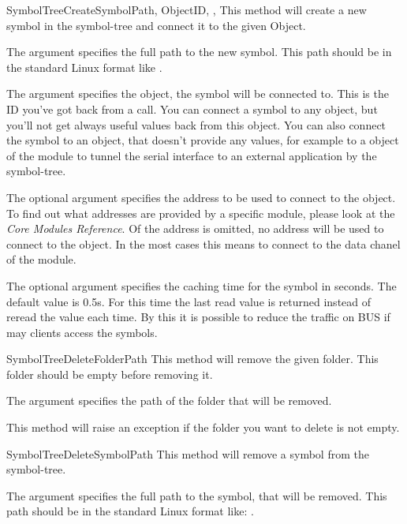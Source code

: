 \begin{methoddesc}[Core]{SymbolTreeCreateSymbol}{Path, ObjectID, , }
This method will create a new symbol in the symbol-tree and connect it to the 
given Object.

The argument  specifies the full path to the new symbol. This path 
should be in the standard Linux format like .

The argument  specifies the object, the symbol will be connected
to. This is the ID you've got back from a  call. You can 
connect a symbol to any object, but you'll not get always useful values back 
from this object. You can also connect the symbol to an object, that doesn't provide
any values, for example to a object of the  module to tunnel the
serial interface to an external application by the symbol-tree.

The optional argument  specifies the address to be used to connect
to the object. To find out what addresses are provided by a specific module,
please look at the \textit{Core Modules Reference}. Of the address is omitted,
no address will be used to connect to the object. In the most cases this means
to connect to the data chanel of the module. 

The optional argument  specifies the caching time for the symbol in
seconds. The default value is 0.5s.
For this time the last read value is returned instead of reread the value each 
time. By this it is possible to reduce the traffic on BUS if may clients access 
the symbols.
\end{methoddesc}


\begin{methoddesc}[Core]{SymbolTreeDeleteFolder}{Path}
This method will remove the given folder. This folder should be empty before removing it.

The argument  specifies the path of the folder that will be removed. 

This method will raise an  exception if the folder you 
want to delete is not empty.
\end{methoddesc}


\begin{methoddesc}[Core]{SymbolTreeDeleteSymbol}{Path}
This method will remove a symbol from the symbol-tree. 

The argument  specifies the full path to the symbol, that will be removed.
This path should be in the standard Linux format like: .
\end{methoddesc}


